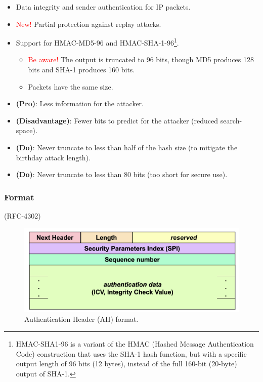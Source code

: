 \begin{itemize}
    \item Data integrity and sender authentication for IP packets.
    \item \textcolor{red}{New!} Partial protection against replay attacks.
    \item Support for HMAC-MD5-96 and HMAC-SHA-1-96\footnote{HMAC-SHA1-96 is a variant of the HMAC (Hashed Message Authentication Code) construction that uses the SHA-1 hash function, but with a specific output length of 96 bits (12 bytes), instead of the full 160-bit (20-byte) output of SHA-1.}.
    \begin{itemize}
        \item \textcolor{red}{Be aware! }The output is truncated to 96 bits, though MD5 produces 128 bits and SHA-1 produces 160 bits.
        \item Packets have the same size.
    \end{itemize} 
\end{itemize}

\begin{tcolorbox}[colback=blue!10!white, colframe=blue!50!white, title={For Any Truncated MAC}]
    \begin{itemize}
        \item \textbf{(Pro)}: Less information for the attacker.
        \item \textbf{(Disadvantage)}: Fewer bits to predict for the attacker (reduced search-space).
        \item \textbf{(Do)}: Never truncate to less than half of the hash size (to mitigate the birthday attack length).
        \item \textbf{(Do)}: Never truncate to less than 80 bits (too short for secure use).
    \end{itemize}
\end{tcolorbox}

\subsubsection{Format}
\begin{center}
    (RFC-4302)
\end{center}

\begin{figure}[H]
    \includegraphics[width=\linewidth]{Images/NetSec/AH_format.png}
    \caption{Authentication Header (AH) format.}
\end{figure}


